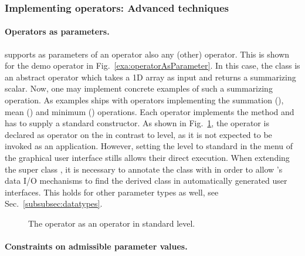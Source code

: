 \subsubsection{Implementing operators: Advanced techniques}
\label{subsubsec:implOperators-advanced}

\paragraph{Operators as parameters.}
\alida supports as parameters of an operator also any (other) \alida operator.
This is shown for the demo operator  in Fig.~\ref{exa:operatorAsParameter}.
In this case, the class  is an abstract operator 
which takes a 1D array as input and returns a summarizing scalar.
Now, one may implement concrete examples of such a summarizing operation. 
As examples \alida ships with operators implementing
the summation (), mean () and minimum
() operations.
Each operator implements the   method and has to supply a
standard constructor.
As shown in Fig.~\ref{exa:ALDArraySum},
the  operator  is declared as operator on the
 in contrast to  level, as
it is not expected to be invoked as an application.
However, setting the level to standard in the menu of the graphical user interface
stills allows their direct execution.
When extending the super class , it is necessary to
annotate the class with  in order to allow \alida's data
I/O mechanisms to find the derived class in automatically generated user
interfaces.
This holds for other parameter types as well, see Sec.~\ref{subsubsec:datatypes}.

\begin{figure}
\vspace{4mm}

\caption{\label{exa:ALDArraySum}The operator  as an operator in standard level.}
\end{figure}

\paragraph{Constraints on admissible parameter values.}

